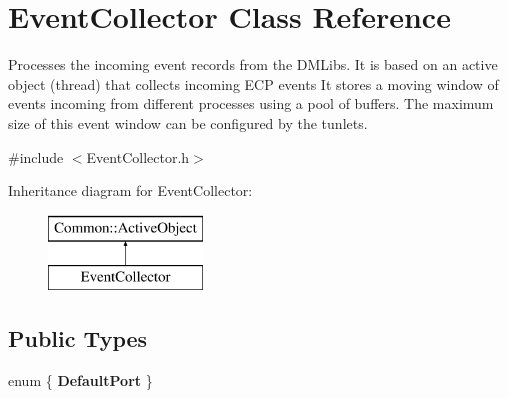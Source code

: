 \hypertarget{class_event_collector}{\section{Event\-Collector Class Reference}
\label{class_event_collector}
}


Processes the incoming event records from the D\-M\-Libs. It is based on an active object (thread) that collects incoming E\-C\-P events It stores a moving window of events incoming from different processes using a pool of buffers. The maximum size of this event window can be configured by the tunlets.  




{\ttfamily \#include $<$Event\-Collector.\-h$>$}

Inheritance diagram for Event\-Collector\-:\begin{figure}[H]
\begin{center}
\leavevmode
\includegraphics[height=2.000000cm]{class_event_collector}
\end{center}
\end{figure}
\subsection*{Public Types}
\begin{DoxyCompactItemize}
\item 
enum \{ {\bfseries Default\-Port}
 \}
\end{DoxyCompactItemize}
